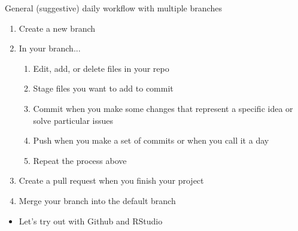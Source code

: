 \documentclass[handout,pdftex,10pt,aspectratio=169]{beamer}
\begin{document}
\begin{frame}{General (suggestive) daily workflow with multiple branches}
  \begin{enumerate}[<+->]
    \item Create a new branch
    \item In your branch...
    \begin{enumerate}
      \item Edit, add, or delete files in your repo
      \item Stage files you want to add to commit
      \item Commit when you make some changes that represent a specific idea or solve particular issues
      \item Push when you make a set of commits or when you call it a day  
      \item Repeat the process above
    \end{enumerate}
    \item Create a pull request when you finish your project
    \item Merge your branch into the default branch
  \end{enumerate}
  \begin{itemize}
    \item<10-> Let's try out with Github and RStudio
  \end{itemize}
\end{frame}
\end{document}

